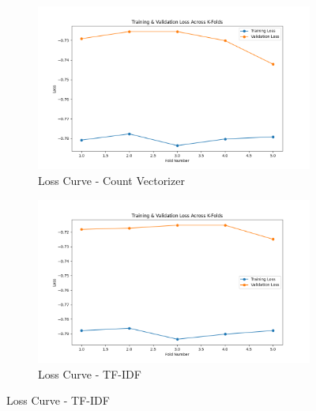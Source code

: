 \begin{figure}[H]
    \centering
    \begin{subfigure}[b]{0.47\textwidth}
        \includegraphics[width=\textwidth]{img/report_info/img/1.3.XGB/best_xgboost_count_loss.png}
        \caption{Loss Curve - Count Vectorizer}
        \label{fig:lr-count-loss}
    \end{subfigure}
    \begin{subfigure}[b]{0.47\textwidth}
        \includegraphics[width=\textwidth]{img/report_info/img/1.3.XGB/best_xgboost_tfidf_loss.png}
        \caption{Loss Curve - TF-IDF}
        \label{fig:lr-tfidf-loss}
    \end{subfigure}
    

\end{figure}
